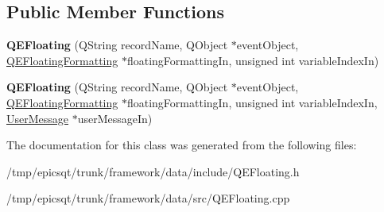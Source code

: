 \subsection*{Public Member Functions}
\begin{DoxyCompactItemize}
\item 
\hypertarget{classQEFloating_a074aeb916e0c352178eea5c8f587a893}{
{\bfseries QEFloating} (QString recordName, QObject $\ast$eventObject, \hyperlink{classQEFloatingFormatting}{QEFloatingFormatting} $\ast$floatingFormattingIn, unsigned int variableIndexIn)}
\label{classQEFloating_a074aeb916e0c352178eea5c8f587a893}

\item 
\hypertarget{classQEFloating_ac87717b4f5a2d38e9cc651cd69366fcc}{
{\bfseries QEFloating} (QString recordName, QObject $\ast$eventObject, \hyperlink{classQEFloatingFormatting}{QEFloatingFormatting} $\ast$floatingFormattingIn, unsigned int variableIndexIn, \hyperlink{classUserMessage}{UserMessage} $\ast$userMessageIn)}
\label{classQEFloating_ac87717b4f5a2d38e9cc651cd69366fcc}

\end{DoxyCompactItemize}


The documentation for this class was generated from the following files:\begin{DoxyCompactItemize}
\item 
/tmp/epicsqt/trunk/framework/data/include/QEFloating.h\item 
/tmp/epicsqt/trunk/framework/data/src/QEFloating.cpp\end{DoxyCompactItemize}

